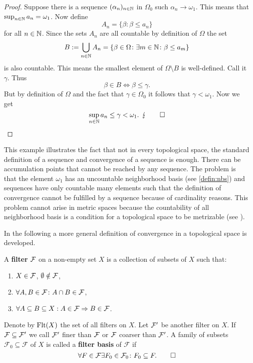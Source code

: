 \begin{proof}
  Suppose there is a sequence $(\alpha_n)_{n\in\mathbb{N}}$ in $\Omega_0$ such $\alpha_n \to \omega_1$. This means that $\sup_{n\in\mathbb{N}} a_n = \omega_1$. Now define
  \begin{equation*}
    A_n = \{\beta\colon \beta \leq a_n\}
  \end{equation*}
  for all $n \in \mathbb{N}$. Since the sets $A_n$ are all countable by definition of $\Omega$ the set
  \begin{equation*}
    B := \bigcup\limits_{n\in\mathbb{N}} A_n = \{\beta \in \Omega\colon \exists m\in\mathbb{N} \colon \beta \leq a_m \}
  \end{equation*}
  is also countable. This means the smallest element of $\Omega\setminus B$ is well-defined. Call it $\gamma$. Thus
  \begin{equation*}
    \beta \in B \iff \beta \leq \gamma. 
  \end{equation*}
  But by definition of $\Omega$ and the fact that $\gamma \in \Omega_0$ it follows that $\gamma < \omega_1$. Now we get
  \begin{equation*}
    \sup\limits_{n\in\mathbb{N}} a_n \leq \gamma < \omega_1. \:\: \lightning \qedhere
  \end{equation*}
\end{proof}

This example illustrates the fact that not in every topological space, the standard definition of a sequence and convergence of a sequence is enough. There can be accumulation points that cannot be reached by any sequence. The problem is that the element $\omega_1$ has an uncountable neighborhood basis (see \ref{defin:nbs}) and sequences have only countable many elements such that the definition of convergence cannot be fulfilled by a sequence because of cardinality reasons. This problem cannot arise in metric spaces because the countability of all neighborhood basis is a condition for a topological space to be metrizable (see \cite[p. 130f]{MunTop}).

In the following a more general definition of convergence in a topological space is developed.
\begin{defin}
  A \textbf{filter} $\mathcal{F}$ on a non-empty set $X$ is a collection of subsets of $X$ such that:
  \begin{enumerate}
    \item $X \in \mathcal{F}$, $\emptyset \notin \mathcal{F}$,
    \item $\forall A, B \in \mathcal{F}\colon A\cap B \in \mathcal{F}$,
    \item $\forall A \subseteq B \subseteq X: A \in \mathcal{F} \Rightarrow B \in \mathcal{F}$.
  \end{enumerate}
  Denote by ${\rm Flt}(X)$ the set of all filters on $X$.
  Let $\mathcal{F}'$ be another filter on $X$. If $\mathcal{F} \subseteq \mathcal{F}'$ we call $\mathcal{F}'$ finer than $\mathcal{F}$ or $\mathcal{F}$ coarser than $\mathcal{F}'$. A family of subsets $\mathcal{F}_0 \subseteq \mathcal{F}$ of $X$ is called a \textbf{filter basis} of $\mathcal{F}$ if
  \begin{equation*}
    \forall F \in \mathcal{F} \exists F_0 \in \mathcal{F}_0\colon F_0 \subseteq F. \qedhere
  \end{equation*}
\end{defin}

